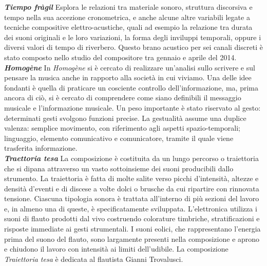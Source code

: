 \documentclass[9pt, twoside, a5paper]{extreport}
\newcommand{\descrizione}[2]{%
\noindent \textbf{\textit{#1}} %
#2 %
\\
}%
\begin{document}
\begin{multicols}{2}
\descrizione{Tiempo fràgil}{Esplora le relazioni tra materiale sonoro, struttura discorsiva e tempo nella sua accezione cronometrica, e anche alcune altre variabili legate a tecniche compositive elettro-acustiche, quali ad esempio la relazione tra durata dei suoni originali e le loro variazioni, la forma degli inviluppi temporali, oppure i diversi valori di tempo di riverbero. Questo brano acustico per sei canali discreti è stato composto nello studio del compositore tra gennaio e aprile del 2014.}


\descrizione{Homogène}{In \textit{Homogène} si è cercato di realizzare un’analisi sullo scrivere e sul pensare la musica anche in rapporto alla società in cui viviamo. Una delle idee fondanti è quella di praticare un cosciente controllo dell’informazione, ma, prima ancora di ciò, si è cercato di comprendere come siano definibili il messaggio musicale e l’informazione musicale. Un peso importante è stato riservato al gesto: determinati gesti svolgono funzioni precise. La gestualità assume una duplice valenza: semplice movimento, con riferimento agli aspetti spazio-temporali; linguaggio, elemento comunicativo e comunicatore, tramite il quale viene trasferita informazione.}






\descrizione{Traettoria tesa}{La composizione è costituita da un lungo percorso o traiettoria che si dipana attraverso un vasto sottoinsieme dei suoni producibili dallo strumento. La traiettoria è fatta di molte salite verso picchi d'intensità, altezze e densità d'eventi e di discese a volte dolci o brusche da cui ripartire con rinnovata tensione. Ciascuna tipologia sonora è trattata all'interno di più sezioni del lavoro e, in almeno una di queste, è specificatamente sviluppata. L'elettronica utilizza i suoni di flauto prodotti dal vivo costruendo colorature timbriche, stratificazioni e risposte immediate ai gesti strumentali. I suoni eolici, che rappresentano l'energia prima del suono del flauto, sono largamente presenti nella composizione e aprono e chiudono il lavoro con intensità ai limiti dell'udibile. La composizione \textit{Traiettoria tesa} è dedicata al flautista Gianni Trovalusci.}


\end{multicols}
\end{document}

